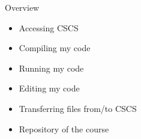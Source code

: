 \begin{frame}{Overview}
  \begin{itemize}
  \item Accessing CSCS
  \item Compiling my code
  \item Running my code
  \item Editing my code
  \item Transferring files from/to CSCS
  \item Repository of the course
  \end{itemize}
\end{frame}
